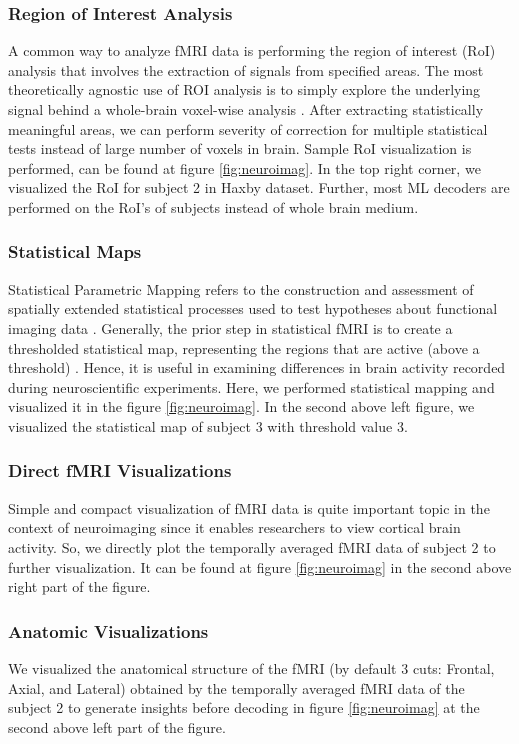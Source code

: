 \documentclass[10pt, twocolumn, letterpaper]{article}
\begin{document}
\subsubsection{Region of Interest Analysis}
A common way to analyze fMRI data is performing the region of interest (RoI) analysis that involves the extraction of signals from specified areas. The most theoretically agnostic use of ROI analysis is to simply explore the underlying signal behind a whole-brain voxel-wise analysis \cite{poldrack2007region}. After extracting statistically meaningful areas, we can perform severity of correction for multiple statistical tests instead of large number of voxels in brain. Sample RoI visualization is performed, can be found at figure \ref{fig:neuroimag}. In the top right corner, we visualized the RoI for subject 2 in Haxby dataset. Further, most ML decoders are performed on the RoI's of subjects instead of whole brain medium.

\subsubsection{Statistical Maps}
Statistical Parametric Mapping refers to the construction and assessment of spatially extended statistical processes used to test hypotheses about functional imaging data \cite{friston1994statistical}. Generally, the prior step in statistical fMRI is to create a thresholded statistical map, representing the regions that are active (above a threshold) \cite{poldrack2007region}. Hence, it is useful in examining differences in brain activity recorded during neuroscientific experiments. Here, we performed statistical mapping and visualized it in the figure \ref{fig:neuroimag}. In the second above left figure, we visualized the statistical map of subject 3 with threshold value 3.


\subsubsection{Direct fMRI Visualizations}
Simple and compact visualization of fMRI data is quite important topic in the context of neuroimaging since it enables researchers to view cortical brain activity. So, we directly plot the temporally averaged fMRI data of subject 2 to further visualization. It can be found at figure \ref{fig:neuroimag} in the second above right part of the figure.


\subsubsection{Anatomic Visualizations}
We visualized the anatomical structure of the fMRI (by default 3 cuts: Frontal, Axial, and Lateral) obtained by the temporally averaged fMRI data of the subject 2 to generate insights before decoding in figure \ref{fig:neuroimag} at the second above left part of the figure. %
\end{document}
